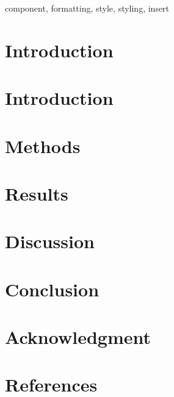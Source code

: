\documentclass[conference]{IEEEtran}
\begin{document}


\begin{IEEEkeywords}
component, formatting, style, styling, insert
\end{IEEEkeywords}

\section{Introduction}
 

\section{Introduction}


\section{Methods}


\section{Results}


\section{Discussion}


\section{Conclusion}



\section*{Acknowledgment}

 

\section*{References}

\nocite{*}



\end{document}
